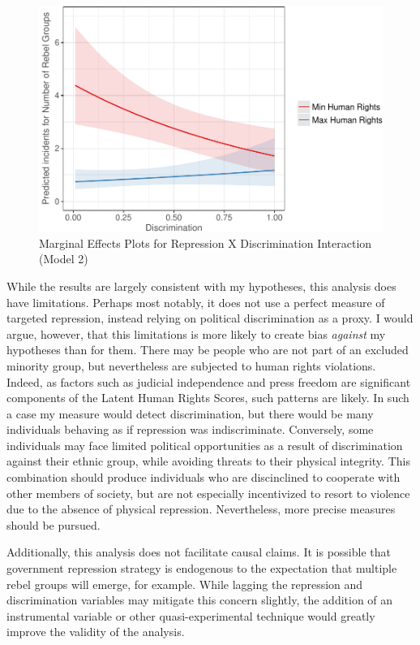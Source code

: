 \documentclass[12pt,]{book}
\begin{document}
\begin{figure}
\centering
\includegraphics{_main_files/figure-latex/interactionplot-1.pdf}
\caption{\label{fig:interactionplot}Marginal Effects Plots for Repression X
Discrimination Interaction (Model 2)}
\end{figure}

While the results are largely consistent with my hypotheses, this
analysis does have limitations. Perhaps most notably, it does not use a
perfect measure of targeted repression, instead relying on political
discrimination as a proxy. I would argue, however, that this limitations
is more likely to create bias \emph{against} my hypotheses than for
them. There may be people who are not part of an excluded minority
group, but nevertheless are subjected to human rights violations.
Indeed, as factors such as judicial independence and press freedom are
significant components of the Latent Human Rights Scores, such patterns
are likely. In such a case my measure would detect discrimination, but
there would be many individuals behaving as if repression was
indiscriminate. Conversely, some individuals may face limited political
opportunities as a result of discrimination against their ethnic group,
while avoiding threats to their physical integrity. This combination
should produce individuals who are discinclined to cooperate with other
members of society, but are not especially incentivized to resort to
violence due to the absence of physical repression. Nevertheless, more
precise measures should be pursued.

Additionally, this analysis does not facilitate causal claims. It is
possible that government repression strategy is endogenous to the
expectation that multiple rebel groups will emerge, for example. While
lagging the repression and discrimination variables may mitigate this
concern slightly, the addition of an instrumental variable or other
quasi-experimental technique would greatly improve the validity of the
analysis.
\end{document}
